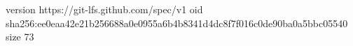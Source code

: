version https://git-lfs.github.com/spec/v1
oid sha256:ee0eaa42e21b256688a0e0955a6b4b8341d4dc8f7f016c0de90ba0a5bbc05540
size 73
